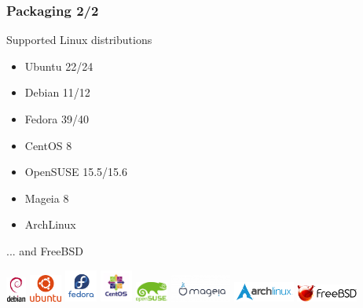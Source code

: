 \documentclass[aspectratio=169]{beamer}
\begin{document}
\begin{frame}
\frametitle{Packaging 2/2}
\begin{block}{Supported Linux distributions}
\begin{itemize}
\item Ubuntu 22/24
\item Debian 11/12
\item Fedora 39/40
\item CentOS 8
\item OpenSUSE 15.5/15.6
\item Mageia 8
\item ArchLinux
\end{itemize}

... and FreeBSD

\end{block}


\begin{center}
\includegraphics[width=0.05\textwidth]{figures/debian-openlogo-100}
\includegraphics[width=0.08\textwidth]{figures/ubuntu}
\includegraphics[width=0.08\textwidth]{figures/Fedora-Logo}
\includegraphics[width=0.08\textwidth]{figures/centos-logo}
\includegraphics[width=0.08\textwidth]{figures/opensuse-logo}
\includegraphics[width=0.15\textwidth]{figures/200px-Logo_mageia_official}
\includegraphics[width=0.15\textwidth]{figures/archlinux-logo}
\includegraphics[width=0.15\textwidth]{figures/FREEBSD_Logo_Horiz_Pos_RGB}
\end{center}

\end{frame}
\end{document}
